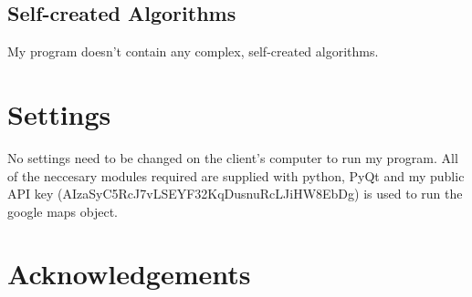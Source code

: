 \subsection{Self-created Algorithms}

My program doesn't contain any complex, self-created algorithms.













\section{Settings}

No settings need to be changed on the client's computer to run my program. All of the neccesary modules required are supplied with python, PyQt and my public API key (AIzaSyC5RcJ7vLSEYF32KqDusnuRcLJiHW8EbDg)  is used to run the google maps object.





\section{Acknowledgements}

